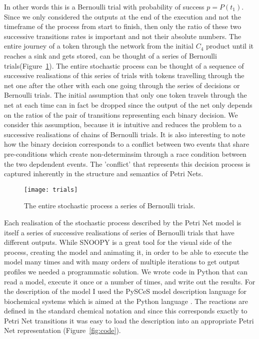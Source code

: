 In other words this is a Bernoulli trial with probability of success
$p = P(t_1)$. Since we only considered the outputs at the end of the
execution and not the timeframe of the process from start to finish,
then only the ratio of these two successive transitions rates is
important and not their absolute numbers. The entire journey of a token through the network
from the initial $C_4$ product until it reaches a sink and gets stored,
can be thought of a series of Bernoulli
trials(Figure~\ref{fig:trials}). The entire stochastic process
can be thought of a sequence of successive realisations of this series
of trials with tokens travelling through the net one
after the other with each one going through the series of decisions
or Bernoulli trials. The initial assumption that only one token
travels through the net at each time can in fact be dropped since the
output of the net only depends on the ratios of the pair of
transitions representing each binary decision. We consider this assumption, because it is intuitive and reduces the  problem to a successive realisations
of chains of Bernoulli trials.
It is also interesting to note how the binary decision
corresponds to a conflict between two events that share pre-conditions
which create non-determinsim through a race condition between the two
depdendent events. The 'conflict' that represents this decision
process is captured inherently in the structure and semantics of Petri
Nets.

\begin{figure}[htbp!]
\centering
\texttt{[image: trials]}
\caption[Stochastic proces as a series of Bernoulli trials]{The entire
stochastic process a series of Bernoulli trials.}
\label{fig:trials}
\end{figure}

Each realisation of the stochastic process described by the Petri Net
model is itself a series of successive realisations of series of
Bernoulli trials that have different outputs. While SNOOPY is a great
tool for the visual side of the process, creating the model and animating
it, in order to be able to execute the model many times and with many
orders of multiple iterations to get
output profiles we needed a programmatic solution. We wrote code in
Python that can read a model, execute it once or a number of times, and write
out the results. For the description of the model I used the PySCeS
model description language for biochemical systems which is aimed at
the Python language \cite [] {olivier2005modelling}. The reactions are
defined in the standard chemical notation and since this corresponds
exactly to Petri Net transitions it was easy to load the description
into an appropriate Petri Net representation (Figure~\ref{fig:code}).

